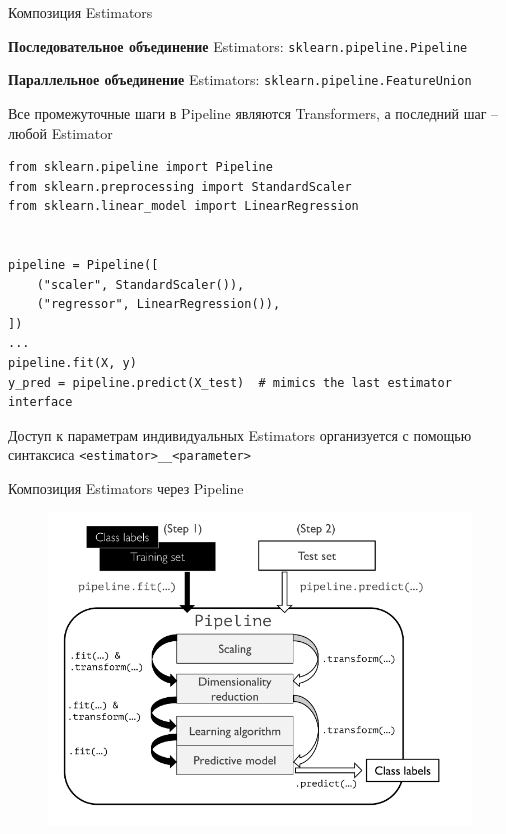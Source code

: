 \documentclass{beamer}
\begin{document}
\begin{frame}[fragile]{Композиция Estimators}
    \scriptsize

    \textbf{Последовательное объединение} Estimators: \texttt{sklearn.pipeline.Pipeline}

    \textbf{Параллельное объединение} Estimators: \texttt{sklearn.pipeline.FeatureUnion}

    \vspace{10pt}
    Все промежуточные шаги в Pipeline являются Transformers, а последний шаг -- любой Estimator

    \begin{lstlisting}
from sklearn.pipeline import Pipeline
from sklearn.preprocessing import StandardScaler
from sklearn.linear_model import LinearRegression


pipeline = Pipeline([
    ("scaler", StandardScaler()),
    ("regressor", LinearRegression()),
])
...
pipeline.fit(X, y)
y_pred = pipeline.predict(X_test)  # mimics the last estimator interface\end{lstlisting}

    Доступ к параметрам индивидуальных Estimators организуется с помощью синтаксиса \texttt{<estimator>\_\_<parameter>}
\end{frame}

\begin{frame}[fragile]{Композиция Estimators через Pipeline}
    \scriptsize

    \begin{figure}
        \includegraphics[width=1.0\textwidth]{sklearn_pipeline.png}
    \end{figure}
\end{frame}
\end{document}
